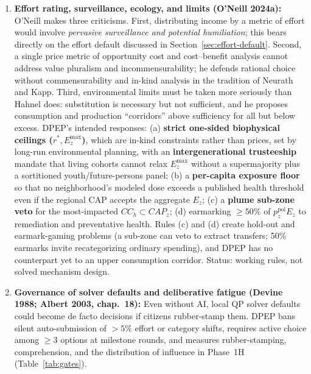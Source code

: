 \documentclass[10pt,twoside,openany]{book}
\theoremstyle{dpepstyle}
\begin{document}
\begin{enumerate}[leftmargin=1.8em,itemsep=3pt]
\begin{itemize}[leftmargin=1.4em,itemsep=1pt]
    \item \emph{Ratchet effect (Weitzman 1980)---open:} Basing endowment charges on physical assets rather than last year's output removes one Soviet-style ratchet. It does not remove the fear that revealed capacity will feed next year's benchmarks, public blueprints (REQ-DATA-03), or $SB/SC$ comparisons. Weitzman (1980) is cited at bibliographic level. Status: open.
  \end{itemize}
  \item \textbf{Effort rating, surveillance, ecology, and limits (O'Neill 2024a):} O'Neill makes three criticisms. First, distributing income by a metric of effort would involve \emph{pervasive surveillance and potential humiliation}; this bears directly on the effort default discussed in Section~\ref{sec:effort-default}. Second, a single price metric of opportunity cost and cost--benefit analysis cannot address value pluralism and incommensurability; he defends rational choice without commensurability and in-kind analysis in the tradition of Neurath and Kapp. Third, environmental limits must be taken more seriously than Hahnel does: substitution is necessary but not sufficient, and he proposes consumption and production ``corridors'' above sufficiency for all but below excess. DPEP's intended responses: (a) \textbf{strict one-sided biophysical ceilings ($r^*, E_z^{\max}$)}, which are in-kind constraints rather than prices, set by long-run environmental planning, with an \textbf{intergenerational trusteeship} mandate that living cohorts cannot relax $E_z^{\max}$ without a supermajority plus a sortitioned youth/future-persons panel; (b) a \textbf{per-capita exposure floor} so that no neighborhood's modeled dose exceeds a published health threshold even if the regional CAP accepts the aggregate $E_z$; (c) a \textbf{plume sub-zone veto} for the most-impacted $CC_h\subset CAP_z$; (d) earmarking $\ge 50\%$ of $p_z^{\text{pol}} E_z$ to remediation and preventative health. Rules (c) and (d) create hold-out and earmark-gaming problems (a sub-zone can veto to extract transfers; 50\% earmarks invite recategorizing ordinary spending), and DPEP has no counterpart yet to an upper consumption corridor. Status: working rules, not solved mechanism design.
  \item \textbf{Governance of solver defaults and deliberative fatigue (Devine 1988; Albert 2003, chap.~18):} Even without AI, local QP solver defaults could become de facto decisions if citizens rubber-stamp them. DPEP bans silent auto-submission of $>5\%$ effort or category shifts, requires active choice among $\ge 3$ options at milestone rounds, and measures rubber-stamping, comprehension, and the distribution of influence in Phase~1H (Table~\ref{tab:gates}).

\end{enumerate}
\end{document}
